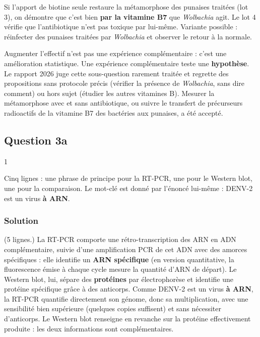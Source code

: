 \documentclass[11pt,a4paper]{article}
\begin{document}
Si l'apport de biotine seule restaure la métamorphose des punaises traitées (lot 3), on démontre que c'est bien \textbf{par la vitamine B7} que \emph{Wolbachia} agit. Le lot 4 vérifie que l'antibiotique n'est pas toxique par lui-même. Variante possible : réinfecter des punaises traitées par \emph{Wolbachia} et observer le retour à la normale.

\begin{piege}

Augmenter l'effectif n'est pas une expérience complémentaire : c'est une amélioration statistique. Une expérience complémentaire teste une \textbf{hypothèse}. Le rapport 2026 juge cette sous-question rarement traitée et regrette des propositions sans protocole précis (vérifier la présence de \emph{Wolbachia}, sans dire comment) ou hors sujet (étudier les autres vitamines B). Mesurer la métamorphose avec et sans antibiotique, ou suivre le transfert de précurseurs radioactifs de la vitamine B7 des bactéries aux punaises, a été accepté.

\end{piege}

\hypertarget{question-3a}{%
\subsection{Question 3a}\label{question-3a}}

\begin{indication}{1}

Cinq lignes : une phrase de principe pour la RT-PCR, une pour le Western blot, une pour la comparaison. Le mot-clé est donné par l'énoncé lui-même : DENV-2 est un virus \textbf{à ARN}.

\end{indication}

\hypertarget{solution-46}{%
\subsubsection{Solution}\label{solution-46}}

(5 lignes.) La RT-PCR comporte une rétro-transcription des ARN en ADN complémentaire, suivie d'une amplification PCR de cet ADN avec des amorces spécifiques : elle identifie un \textbf{ARN spécifique} (en version quantitative, la fluorescence émise à chaque cycle mesure la quantité d'ARN de départ). Le Western blot, lui, sépare des \textbf{protéines} par électrophorèse et identifie une protéine spécifique grâce à des anticorps. Comme DENV-2 est un virus \textbf{à ARN}, la RT-PCR quantifie directement son génome, donc sa multiplication, avec une sensibilité bien supérieure (quelques copies suffisent) et sans nécessiter d'anticorps. Le Western blot renseigne en revanche sur la protéine effectivement produite : les deux informations sont complémentaires.
\end{document}
